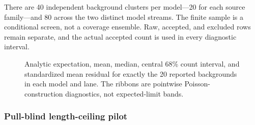 \begin{table}[htbp]
\centering
\caption{Frozen five-lane closure inventory.  Each lane contains 20 background
labels per model, five mass hypotheses, and four injection strengths, hence 400
raw extraction states per lane and model.  Repeated labels in nested lanes are
not additional independent backgrounds.}
\label{tab:v4p8p3-five-lane-inventory}
\end{table}

There are 40 independent background clusters per model---20 for each source
family---and 80 across the two distinct model streams.  The finite sample is a
conditional screen, not a coverage ensemble.  Raw, accepted, and excluded rows
remain separate, and the actual accepted count is used in every diagnostic
interval.

\begin{figure}[htbp]
\centering
{}
\caption{Analytic expectation, mean,
median, central 68\% count interval, and standardized mean residual for exactly
the 20 reported backgrounds in each model and lane.  The ribbons are
pointwise Poisson-construction diagnostics, not expected-limit bands.}
\label{fig:v4p8p3-five-lane-sampling}
\end{figure}

\subsubsection{Pull-blind length-ceiling pilot}

